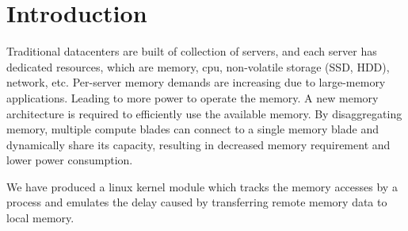 
\newcommand{\etas}{\ensuremath{\eta_{\mathrm{s}}}}


\chapter{Introduction}

Traditional datacenters are built of collection of servers, and each server has dedicated resources, which are memory, cpu, non-volatile storage (SSD, HDD), network, etc. Per-server memory demands are increasing due to large-memory applications. Leading to more power to operate the memory. A new memory architecture is required to efficiently use the available memory. By disaggregating memory, multiple compute blades can connect to a single memory blade and dynamically share its capacity, resulting in decreased memory requirement and lower power consumption.

We have produced a linux kernel module which tracks the memory accesses by a process and emulates the delay caused by transferring remote memory data to local memory.






